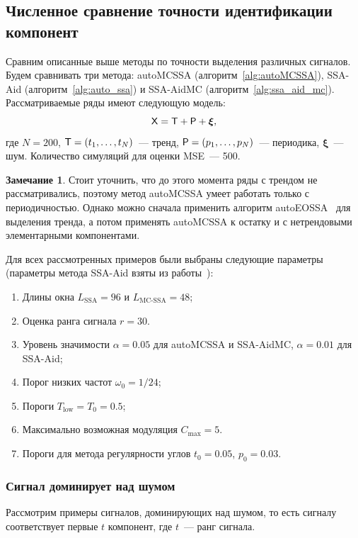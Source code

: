 \documentclass[specialist,
substylefile = spbu_report.rtx,
subf,12pt]{disser}
\theoremstyle{definition}
\newtheorem{remark}{Замечание}[chapter]
\begin{document}
\subsection{Численное сравнение точности идентификации компонент}\label{sect:ssa_aid_mc_comparison}

Сравним описанные выше методы по точности выделения различных сигналов. Будем сравнивать три метода: autoMCSSA (алгоритм~\ref{alg:autoMCSSA}), SSA-Aid (алгоритм~\ref{alg:auto_ssa}) и SSA-AidMC (алгоритм~\ref{alg:ssa_aid_mc}). Рассматриваемые ряды имеют следующую модель:
\[
	\mathsf{X} = \mathsf{T} + \mathsf{P} + \bm{\xi},
\]
где $N=200$, $\mathsf{T}=(t_1,\ldots, t_N)$~--- тренд, $\mathsf{P}=(p_1,\ldots, p_N)$~--- периодика, $\bm\xi$~--- шум. Количество симуляций для оценки MSE~--- 500.

\begin{remark}
	Стоит уточнить, что до этого момента ряды с трендом не рассматривались, поэтому метод autoMCSSA умеет работать только с периодичностью. Однако можно сначала применить алгоритм autoEOSSA~\cite{autoSSA} для выделения тренда, а потом применять autoMCSSA к остатку и с нетрендовыми элементарными компонентами.
\end{remark}

Для всех рассмотренных примеров были выбраны следующие параметры (параметры метода SSA-Aid взяты из работы~\cite{Dudnik2025}):
\begin{enumerate}
	\item Длины окна $L_\text{SSA}=96$ и $L_\text{MC-SSA}=48$;
	\item Оценка ранга сигнала $r=30$.
	\item Уровень значимости $\alpha=0.05$ для autoMCSSA и SSA-AidMC, $\alpha=0.01$ для SSA-Aid;
	\item Порог низких частот $\omega_0=1/24$;
	\item Пороги $T_\text{low}=T_0=0.5$;
	\item Максимально возможная модуляция $C_{\max}=5$.
	\item Пороги для метода регулярности углов $t_0=0.05$, $p_0=0.03$.
\end{enumerate}

\subsubsection{Сигнал доминирует над шумом}

Рассмотрим примеры сигналов, доминирующих над шумом, то есть сигналу соответствует первые $t$ компонент, где $t$~--- ранг сигнала.
\end{document}
